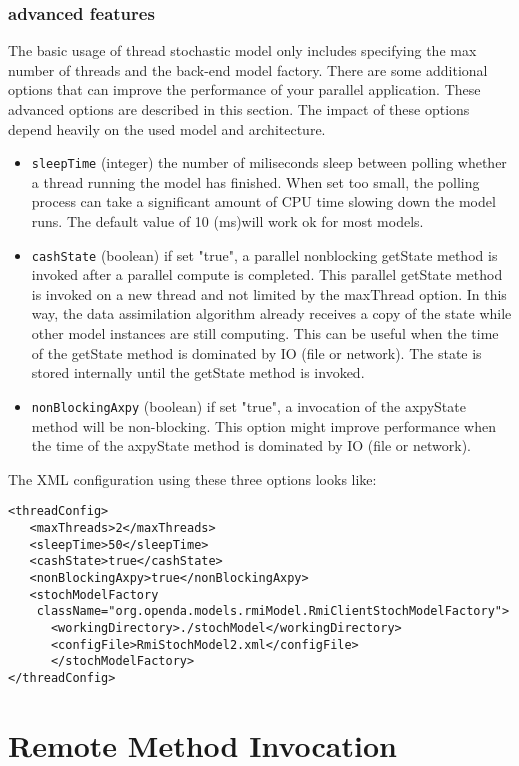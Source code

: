 \subsubsection{advanced features}
The basic usage of thread stochastic model only includes specifying the max
number of threads and the back-end model factory. There are some additional
options that can improve the performance of your parallel application. These
advanced options are described in this section. The impact of these options
depend heavily on the used model and architecture.
\begin{itemize}
\item {\tt sleepTime} (integer) the number of miliseconds sleep between polling whether a thread running the model has finished. When set too small, the polling process can take a significant amount of CPU time slowing down the model runs. The default value of 10 (ms)will work ok for most models. 
\item {\tt cashState} (boolean) if set "true", a parallel nonblocking getState
  method is invoked after a parallel compute is completed. This parallel
  getState method is invoked on a new thread and not limited by the maxThread
  option. In this way, the data assimilation algorithm already receives a copy
  of the state while other model instances are still computing. This can be
  useful when the time of the getState method is dominated by IO (file or
  network). The state is stored internally until the getState method is
  invoked.

\item{\tt nonBlockingAxpy} (boolean) if set "true", a invocation of the
  axpyState method will be non-blocking. This option might improve performance
  when the time of the axpyState method is dominated by IO (file or network).
\end{itemize}

The XML configuration using these three options looks like:
{\small
\begin{verbatim}
<threadConfig>
   <maxThreads>2</maxThreads>
   <sleepTime>50</sleepTime>
   <cashState>true</cashState>
   <nonBlockingAxpy>true</nonBlockingAxpy>
   <stochModelFactory
    className="org.openda.models.rmiModel.RmiClientStochModelFactory">
      <workingDirectory>./stochModel</workingDirectory>
      <configFile>RmiStochModel2.xml</configFile>
      </stochModelFactory>
</threadConfig>
\end{verbatim}
}

\section{Remote Method Invocation}

